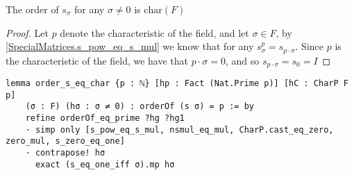 \begin{lemma}
    \label{SpecialMatrices.order_s_eq_char}
    \leanok
    The order of $s_\sigma$ for any $\sigma \ne 0$ is $\textrm{char}(F)$
    \end{lemma}
    
    \begin{proof}
    \leanok
    Let $p$ denote the characteristic of the field, and let $\sigma \in F$, by \ref{SpecialMatrices.s_pow_eq_s_mul} we know that for any $s_\sigma^p = s_{p \cdot \sigma}$. 
    Since $p$ is the characteristic of the field, we have that $p \cdot \sigma = 0$, and so $s_{p \cdot \sigma} = s_0 = I$
    \end{proof}
\begin{footnotesize}
\begin{verbatim}
lemma order_s_eq_char {p : ℕ} [hp : Fact (Nat.Prime p)] [hC : CharP F p]
    (σ : F) (hσ : σ ≠ 0) : orderOf (s σ) = p := by
    refine orderOf_eq_prime ?hg ?hg1
    · simp only [s_pow_eq_s_mul, nsmul_eq_mul, CharP.cast_eq_zero, zero_mul, s_zero_eq_one]
    · contrapose! hσ
      exact (s_eq_one_iff σ).mp hσ
\end{verbatim}
\end{footnotesize}

